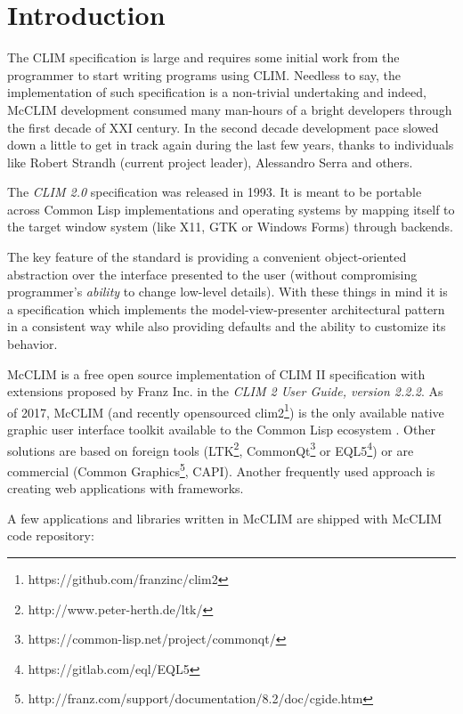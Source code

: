 \documentclass{sig-alternate-05-2015}
\begin{document}

\section{Introduction}

The CLIM specification\cite{CLIM2} is large and requires some initial
work from the programmer to start writing programs using
CLIM. Needless to say, the implementation of such specification is a
non-trivial undertaking and indeed, McCLIM development consumed many
man-hours of a bright developers through the first decade of XXI
century. In the second decade development pace slowed down a little to
get in track again during the last few years, thanks to individuals
like Robert Strandh (current project leader), Alessandro Serra and
others.

The \emph{CLIM 2.0} specification was released in 1993. It is meant to
be portable across Common Lisp\cite{ansi:common:lisp} implementations
and operating systems by mapping itself to the target window system
(like X11\cite{Scheifler:1986:XWS:22949.24053},
GTK\cite{Pennington:1999:GAD:554548} or Windows
Forms\cite{Sells:2006:WFP:1146336}) through backends.

The key feature of the standard is providing a convenient
object-oriented abstraction over the interface presented to the user
(without compromising programmer's \emph{ability} to change low-level
details). With these things in mind it is a specification which
implements the model-view-presenter architectural pattern in a
consistent way while also providing defaults and the ability to
customize its behavior.

McCLIM is a free open source implementation of CLIM II specification
with extensions proposed by Franz Inc. in the \emph{CLIM 2 User Guide,
  version 2.2.2}.  As of 2017, McCLIM (and recently opensourced
clim2\footnote{https://github.com/franzinc/clim2}) is the only
available native graphic user interface toolkit available to the
Common Lisp ecosystem . Other solutions are based on foreign tools
(LTK\footnote{http://www.peter-herth.de/ltk/},
CommonQt\footnote{https://common-lisp.net/project/commonqt/} or
EQL5\footnote{https://gitlab.com/eql/EQL5}) or are commercial (Common
Graphics\footnote{http://franz.com/support/documentation/8.2/doc/cgide.htm},
CAPI\cite{http://www.lispworks.com/products/capi.html}). Another
frequently used approach is creating web applications with frameworks.

A few applications and libraries written in McCLIM are shipped with
McCLIM code repository:
\end{document}
